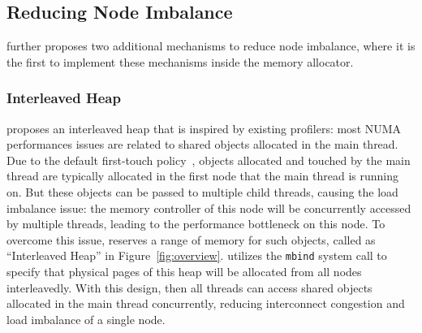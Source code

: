\subsection{Reducing Node Imbalance}
\label{sec:balance}

\NM{} further proposes two additional mechanisms to reduce node imbalance, where it is the first to implement these mechanisms inside the memory allocator. 

\subsubsection{Interleaved Heap} 
\NA{} proposes an interleaved heap that is inspired by existing profilers\citep{XULIU, MemProf}: most NUMA performances issues  are related to shared objects allocated in the main thread. Due to the default first-touch policy~\citep{lameter2013numa, diener2015locality}, objects allocated and touched by the main thread are typically allocated in the first node that the main thread is running on. But these objects can be passed to multiple child threads, causing the load imbalance issue: the memory controller of this node will be concurrently accessed by multiple threads, leading to the performance bottleneck on this node. To overcome this issue, \NA{} reserves a range of memory for such objects, called as ``Interleaved Heap'' in Figure~\ref{fig:overview}. \NA{} utilizes the \texttt{mbind} system call to specify that physical pages of this heap will be allocated from all nodes interleavedly. With this design, then all threads can access shared objects allocated in the main thread concurrently, reducing interconnect congestion and load imbalance of a single node. 

